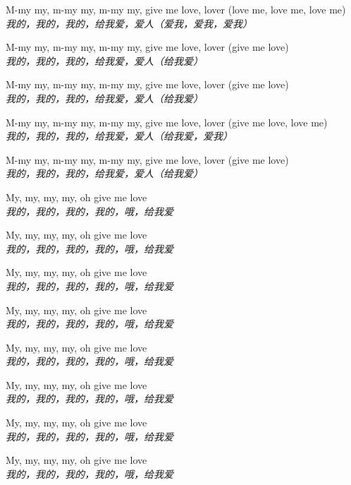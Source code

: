 \begin{spacing}{1.5}
\begin{flushleft}
M-my my, m-my my, m-my my, give me love, lover (love me, love me, love me)\\
\textit{我的，我的，我的，给我爱，爱人（爱我，爱我，爱我）}\lyricspace

M-my my, m-my my, m-my my, give me love, lover (give me love)\\
\textit{我的，我的，我的，给我爱，爱人（给我爱）}\lyricspace

M-my my, m-my my, m-my my, give me love, lover (give me love)\\
\textit{我的，我的，我的，给我爱，爱人（给我爱）}\lyricspace

M-my my, m-my my, m-my my, give me love, lover (give me love, love me)\\
\textit{我的，我的，我的，给我爱，爱人（给我爱，爱我）}\lyricspace

M-my my, m-my my, m-my my, give me love, lover (give me love)\\
\textit{我的，我的，我的，给我爱，爱人（给我爱）}\lyricspace

My, my, my, my, oh give me love\\
\textit{我的，我的，我的，我的，哦，给我爱}\lyricspace

My, my, my, my, oh give me love\\
\textit{我的，我的，我的，我的，哦，给我爱}\lyricspace

My, my, my, my, oh give me love\\
\textit{我的，我的，我的，我的，哦，给我爱}\lyricspace

My, my, my, my, oh give me love\\
\textit{我的，我的，我的，我的，哦，给我爱}\lyricspace

My, my, my, my, oh give me love\\
\textit{我的，我的，我的，我的，哦，给我爱}\lyricspace

My, my, my, my, oh give me love\\
\textit{我的，我的，我的，我的，哦，给我爱}\lyricspace

My, my, my, my, oh give me love\\
\textit{我的，我的，我的，我的，哦，给我爱}\lyricspace

My, my, my, my, oh give me love\\
\textit{我的，我的，我的，我的，哦，给我爱}\lyricspace
\end{flushleft}
\end{spacing} 
